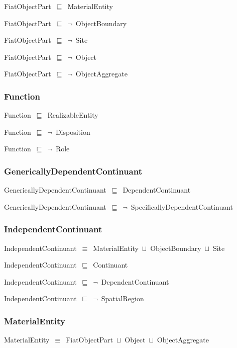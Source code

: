 \documentclass{article}
\begin{document}
FiatObjectPart~\ensuremath{\sqsubseteq}~MaterialEntity~

FiatObjectPart~\ensuremath{\sqsubseteq}~\ensuremath{\lnot}~ObjectBoundary

FiatObjectPart~\ensuremath{\sqsubseteq}~\ensuremath{\lnot}~Site

FiatObjectPart~\ensuremath{\sqsubseteq}~\ensuremath{\lnot}~Object

FiatObjectPart~\ensuremath{\sqsubseteq}~\ensuremath{\lnot}~ObjectAggregate

\subsubsection*{Function}

Function~\ensuremath{\sqsubseteq}~RealizableEntity~

Function~\ensuremath{\sqsubseteq}~\ensuremath{\lnot}~Disposition

Function~\ensuremath{\sqsubseteq}~\ensuremath{\lnot}~Role

\subsubsection*{GenericallyDependentContinuant}

GenericallyDependentContinuant~\ensuremath{\sqsubseteq}~DependentContinuant~

GenericallyDependentContinuant~\ensuremath{\sqsubseteq}~\ensuremath{\lnot}~SpecificallyDependentContinuant

\subsubsection*{IndependentContinuant}

IndependentContinuant~\ensuremath{\equiv}~MaterialEntity~\ensuremath{\sqcup}~ObjectBoundary~\ensuremath{\sqcup}~Site

IndependentContinuant~\ensuremath{\sqsubseteq}~Continuant~

IndependentContinuant~\ensuremath{\sqsubseteq}~\ensuremath{\lnot}~DependentContinuant

IndependentContinuant~\ensuremath{\sqsubseteq}~\ensuremath{\lnot}~SpatialRegion

\subsubsection*{MaterialEntity}

MaterialEntity~\ensuremath{\equiv}~FiatObjectPart~\ensuremath{\sqcup}~Object~\ensuremath{\sqcup}~ObjectAggregate
\end{document}
